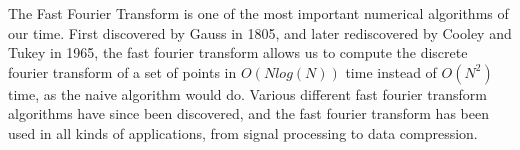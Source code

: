 The Fast Fourier Transform is one of the most important numerical algorithms of our time. First discovered by Gauss in 1805, and later rediscovered by Cooley and Tukey in 1965, the fast fourier transform allows us to compute the discrete fourier transform of a set of points in $O(Nlog(N))$ time instead of $O(N^2)$ time, as the naive algorithm would do. Various different fast fourier transform algorithms have since been discovered, and the fast fourier transform has been used in all kinds of applications, from signal processing to data compression.

